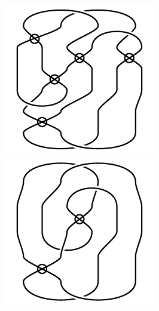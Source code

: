 \begin{figure}[H]
\begin{minipage}[b]{.18\linewidth}
\centering
\includegraphics[width=\linewidth]{../data/virtual_4_62.png}
\end{minipage}
\begin{minipage}[b]{.18\linewidth}
\centering
\includegraphics[width=\linewidth]{../data/virtual_4_63.png}

\end{minipage}
\end{figure}
